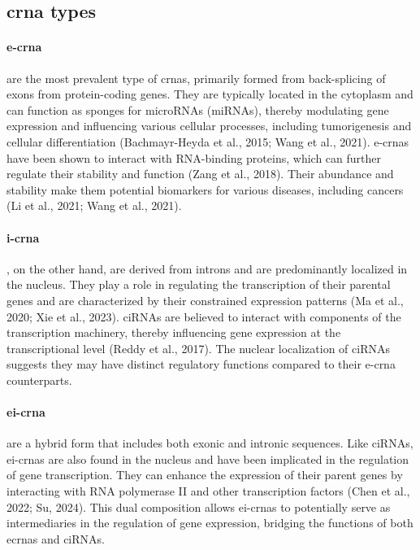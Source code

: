 \subsection{\gls{crna} types}
\label{sec:circrna_types}

\paragraph{\gls{e-crna}} are the most prevalent type of
\gls{crna}s, primarily formed from back-splicing of exons from protein-coding
genes.
They are typically located in the cytoplasm and can function as sponges for
microRNAs (miRNAs), thereby modulating gene expression and influencing various
cellular processes, including tumorigenesis and cellular differentiation
(Bachmayr-Heyda et al., 2015; Wang et al., 2021).
\gls{e-crna}s have been shown to interact with RNA-binding proteins, which can
further regulate their stability and function (Zang et al., 2018).
Their abundance and stability make them potential biomarkers for various
diseases, including cancers (Li et al., 2021; Wang et al., 2021).

\paragraph{\gls{i-crna}}, on the other hand, are derived
from introns
and are predominantly localized in the nucleus.
They play a role in regulating the transcription of their parental genes and
are characterized by their constrained expression patterns (Ma et al., 2020;
Xie et al., 2023).
ciRNAs are
believed to interact with components of the transcription machinery, thereby
influencing gene expression at the transcriptional level (Reddy et al., 2017).
The nuclear localization of ciRNAs suggests they may have distinct regulatory
functions compared to their \gls{e-crna} counterparts.

\paragraph{\gls{ei-crna}} are a hybrid form that
includes both
exonic and intronic sequences.
Like ciRNAs, \gls{ei-crna}s are also found in the nucleus and have been implicated in
the regulation of gene transcription.
They can enhance the expression of their parent genes by interacting with RNA
polymerase II and other transcription factors (Chen et al., 2022; Su, 2024).
This dual composition allows \gls{ei-crna}s to potentially serve as intermediaries in
the regulation of gene expression, bridging the functions of both e\gls{crna}s
and ciRNAs.


